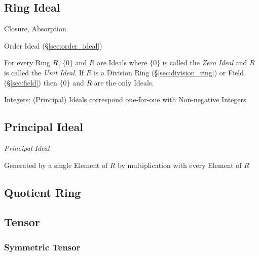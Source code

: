 \subsection{Ring Ideal}\label{sec:ring_ideal}

Closure, Absorption

Order Ideal (\S\ref{sec:order_ideal})

For every Ring $R$, $\{0\}$ and $R$ are Ideals where $\{0\}$ is called
the \emph{Zero Ideal} and $R$ is called the \emph{Unit Ideal}. If $R$
is a Division Ring (\S\ref{sec:division_ring}) or Field
(\S\ref{sec:field}) then $\{0\}$ and $R$ are the only Ideals.

Integers: (Principal) Ideals correspond one-for-one with Non-negative Integers



\subsection{Principal Ideal}\label{sec:principal_ideal}

\emph{Principal Ideal}

Generated by a single Element of $R$ by multiplication with every
Element of $R$



\subsection{Quotient Ring}\label{sec:quotient_ring}

\subsection{Tensor}\label{sec:tensor}

\subsubsection{Symmetric Tensor}\label{sec:symmetric_tensor}

